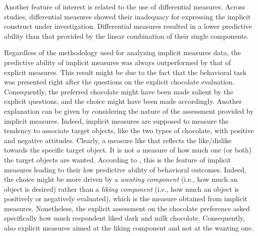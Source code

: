\documentclass[12pt]{book}
\begin{document}
Another feature of interest is related to the use of differential measures. 
Across studies, differential measures showed their inadequacy for expressing the implicit construct under investigation. Differential measures resulted in a lower predictive ability than that provided by the linear combination of their single components. 


Regardless of the methodology used for analyzing implicit measures data, the predictive ability of implicit measures was always outperformed by that of explicit measures. 
This result might be due to the fact that the behavioral task was presented right after the questions on the explicit chocolate evaluation. Consequently, the preferred chocolate might have been made salient by the explicit questions, and the choice might have been made accordingly. 
Another explanation can be given by considering the nature of the assessment provided by implicit measures. 
Indeed, implicit measures are supposed to measure the tendency to associate target objects, like the two types of chocolate, with positive and negative attitudes. Clearly, a measure like that reflects the like/dislike towards the specific target object. It is not a measure of how much one (or both) the target objects are wanted. According to , this is the feature of implicit measures leading to their low predictive ability of behavioral outcomes. 
Indeed, the choice might be more driven by a \emph{wanting component }(i.e., how much an object is desired) rather than a \emph{liking component} (i.e., how much an object is positively or negatively evaluated), which is the measure obtained from implicit measures. 
Nonetheless, the explicit assessment on the chocolate preference asked specifically how much respondent liked dark and milk chocolate. Consequently, also explicit measures aimed at the liking component and not at the wanting one. 




\end{document}
